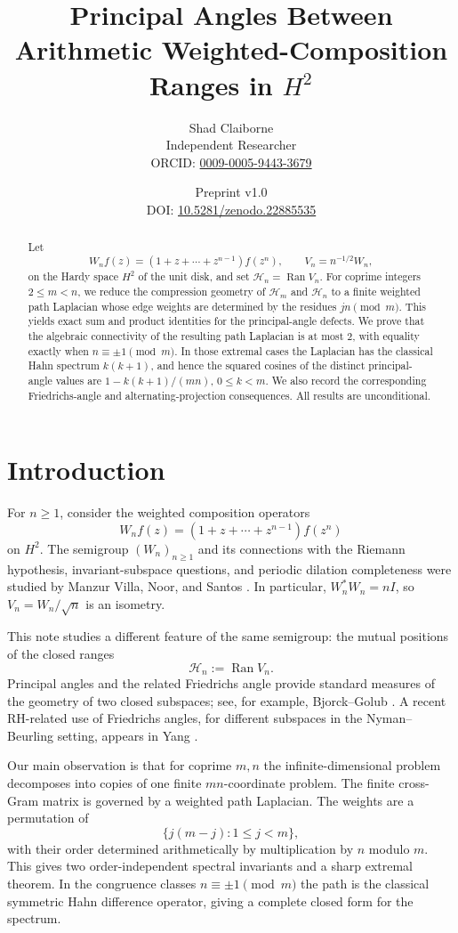 \documentclass[11pt]{article}
\title{Principal Angles Between Arithmetic Weighted-Composition Ranges in $H^2$}
\author{Shad Claiborne\\\small Independent Researcher\\\small ORCID: \href{https://orcid.org/0009-0005-9443-3679}{0009-0005-9443-3679}}
\date{Preprint v1.0\\\small DOI: \href{https://doi.org/10.5281/zenodo.22885535}{10.5281/zenodo.22885535}}
\theoremstyle{remark}
\newcommand{\Hsq}{H^2}
\newcommand{\Ran}{\operatorname{Ran}}
\newcommand{\1}{\mathbf 1}
\begin{document}
\maketitle

\begin{abstract}
Let
\[
W_nf(z)=(1+z+\cdots+z^{n-1})f(z^n),\qquad V_n=n^{-1/2}W_n,
\]
on the Hardy space $H^2$ of the unit disk, and set $\mathcal H_n=\Ran V_n$.
For coprime integers $2\le m<n$, we reduce the compression geometry of
$\mathcal H_m$ and $\mathcal H_n$ to a finite weighted path Laplacian whose
edge weights are determined by the residues $jn\pmod m$. This yields exact
sum and product identities for the principal-angle defects. We prove that the
algebraic connectivity of the resulting path Laplacian is at most $2$, with
equality exactly when $n\equiv\pm1\pmod m$. In those extremal cases the
Laplacian has the classical Hahn spectrum $k(k+1)$, and hence the squared
cosines of the distinct principal-angle values are
$1-k(k+1)/(mn)$, $0\le k<m$. We also record the corresponding Friedrichs-angle
and alternating-projection consequences. All results are unconditional.
\end{abstract}

\section{Introduction}
For $n\ge1$, consider the weighted composition operators
\[
W_nf(z)=(1+z+\cdots+z^{n-1})f(z^n)
\]
on $\Hsq$. The semigroup $(W_n)_{n\ge1}$ and its connections with the
Riemann hypothesis, invariant-subspace questions, and periodic dilation
completeness were studied by Manzur Villa, Noor, and Santos
\cite{ManzurNoorSantos2023}. In particular, $W_n^*W_n=nI$, so
$V_n=W_n/\sqrt n$ is an isometry.

This note studies a different feature of the same semigroup: the mutual
positions of the closed ranges
\[
\mathcal H_n:=\Ran V_n.
\]
Principal angles and the related Friedrichs angle provide standard measures
of the geometry of two closed subspaces; see, for example,
Bjorck--Golub \cite{BjorckGolub1973}. A recent RH-related use of Friedrichs
angles, for different subspaces in the Nyman--Beurling setting, appears in
Yang \cite{Yang2026}.

Our main observation is that for coprime $m,n$ the infinite-dimensional
problem decomposes into copies of one finite $mn$-coordinate problem. The
finite cross-Gram matrix is governed by a weighted path Laplacian. The
weights are a permutation of
\[
\{j(m-j):1\le j<m\},
\]
with their order determined arithmetically by multiplication by $n$ modulo
$m$. This gives two order-independent spectral invariants and a sharp
extremal theorem. In the congruence classes $n\equiv\pm1\pmod m$ the path is
the classical symmetric Hahn difference operator, giving a complete closed
form for the spectrum.
\end{document}
